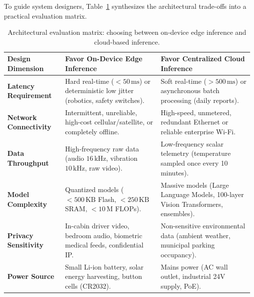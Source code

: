 To guide system designers, Table~\ref{tab:edge_vs_cloud_matrix} synthesizes the architectural trade-offs into a practical evaluation matrix.

\begin{table}[htbp]
\centering
\small
\renewcommand{\arraystretch}{1.25}
\begin{tabular}{p{3.2cm} p{5.5cm} p{5.5cm}}
\toprule
\textbf{Design Dimension} & \textbf{Favor On-Device Edge Inference} & \textbf{Favor Centralized Cloud Inference} \\
\midrule
\textbf{Latency Requirement} & Hard real-time ($< 50\,\text{ms}$) or deterministic low jitter (robotics, safety switches). & Soft real-time ($> 500\,\text{ms}$) or asynchronous batch processing (daily reports). \\
\textbf{Network Connectivity} & Intermittent, unreliable, high-cost cellular/satellite, or completely offline. & High-speed, unmetered, redundant Ethernet or reliable enterprise Wi-Fi. \\
\textbf{Data Throughput} & High-frequency raw data (audio $16\,\text{kHz}$, vibration $10\,\text{kHz}$, raw video). & Low-frequency scalar telemetry (temperature sampled once every 10 minutes). \\
\textbf{Model Complexity} & Quantized models ($< 500\,\text{KB}$ Flash, $< 250\,\text{KB}$ SRAM, $< 10\,\text{M}$ FLOPs). & Massive models (Large Language Models, 100-layer Vision Transformers, ensembles). \\
\textbf{Privacy Sensitivity} & In-cabin driver video, bedroom audio, biometric medical feeds, confidential IP. & Non-sensitive environmental data (ambient weather, municipal parking occupancy). \\
\textbf{Power Source} & Small Li-ion battery, solar energy harvesting, button cells (CR2032). & Mains power (AC wall outlet, industrial 24V supply, PoE). \\
\bottomrule
\end{tabular}
\caption{Architectural evaluation matrix: choosing between on-device edge inference and cloud-based inference.}\label{tab:edge_vs_cloud_matrix}
\end{table}

